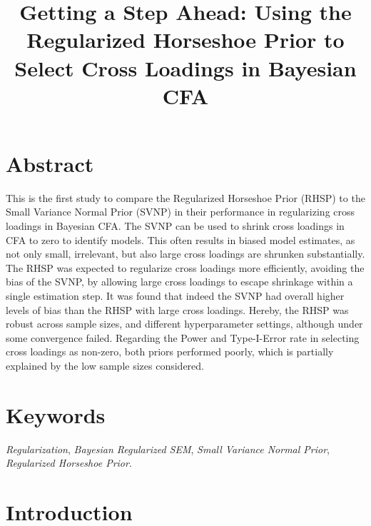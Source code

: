 \documentclass[
  man, donotrepeattitle,floatsintext]{apa6}
\title{Getting a Step Ahead: Using the Regularized Horseshoe Prior to Select Cross Loadings in Bayesian CFA}
\author{\phantom{0}}
\date{}
\affiliation{\phantom{0}}
\begin{document}
\maketitle

\setcounter{page}{0}
\thispagestyle{empty}
\pagestyle{fancy}

\clearpage

\hypertarget{abstract}{%
\section{Abstract}\label{abstract}}

This is the first study to compare the Regularized Horseshoe Prior
(RHSP) to the Small Variance Normal Prior (SVNP) in their performance in
regularizing cross loadings in Bayesian CFA. The SVNP can be used to
shrink cross loadings in CFA to zero to identify models. This often
results in biased model estimates, as not only small, irrelevant, but
also large cross loadings are shrunken substantially. The RHSP was
expected to regularize cross loadings more efficiently, avoiding the
bias of the SVNP, by allowing large cross loadings to escape shrinkage
within a single estimation step. It was found that indeed the SVNP had
overall higher levels of bias than the RHSP with large cross loadings.
Hereby, the RHSP was robust across sample sizes, and different
hyperparameter settings, although under some convergence failed.
Regarding the Power and Type-I-Error rate in selecting cross loadings as
non-zero, both priors performed poorly, which is partially explained by
the low sample sizes considered.

\vfill

\hypertarget{keywords}{%
\section{Keywords}\label{keywords}}

\emph{Regularization}, \emph{Bayesian Regularized SEM}, \emph{Small Variance Normal
Prior}, \emph{Regularized Horseshoe Prior}.

\clearpage

\setcounter{secnumdepth}{5}

\hypertarget{introduction}{%
\section{Introduction}\label{introduction}}
\end{document}
